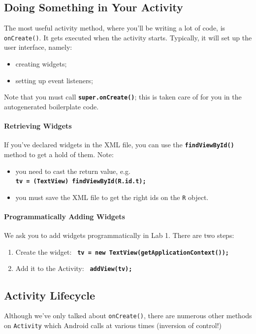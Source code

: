\subsection*{Doing Something in Your Activity}
The most useful activity method, where you'll be writing a lot of
code, is \texttt{onCreate()}. It gets executed when the activity 
starts. Typically, it will set up the user interface, namely:
\begin{itemize}
\item creating widgets;
\item setting up event listeners;
\end{itemize}

Note that you must call {\texttt{\textbf{super.onCreate()}}}; this
is taken care of for you in the autogenerated boilerplate code.

\paragraph{Retrieving Widgets} If you've declared widgets in the
XML file, you can use the {\texttt{\textbf{findViewById()}}} method
to get a hold of them. Note:
\begin{itemize}
\item you need to cast the return value, e.g. \\
\texttt{\textbf{tv = (TextView) findViewById(R.id.t);}}
\item you must save the XML file to get the right ids on the {\tt R} object.
\end{itemize}

\paragraph{Programmatically Adding Widgets} We ask you to
add widgets programmatically in Lab 1. There are two steps:
\begin{enumerate}
\item Create the widget: 
\texttt{\textbf{~tv = new TextView(getApplicationContext());}} 
\item Add it to the Activity:
\texttt{\textbf{~addView(tv);}}
\end{enumerate}

\subsection*{Activity Lifecycle}
Although we've only talked about {\tt onCreate()}, there are numerous
other methods on {\tt Activity} which Android calls at various times
(inversion of control!)

